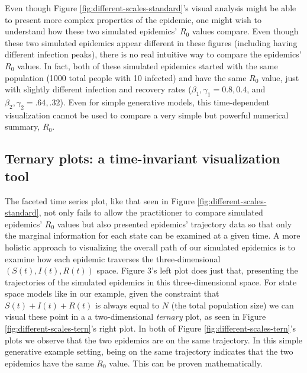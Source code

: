\documentclass[
  shortnames]{jss}
\begin{document}
Even though Figure \ref{fig:different-scales-standard}'s visual analysis
might be able to present more complex properties of the epidemic, one
might wish to understand how these two simulated epidemics' \(R_0\)
values compare. Even though these two simulated epidemics appear
different in these figures (including having different infection peaks),
there is no real intuitive way to compare the epidemics' \(R_0\) values.
In fact, both of these simulated epidemics started with the same
population (1000 total people with 10 infected) and have the same
\(R_0\) value, just with slightly different infection and recovery rates
(\(\beta_1, \gamma_1 = 0.8, 0.4\), and
\(\beta_2, \gamma_2 = .64, .32\)). Even for simple generative models,
this time-dependent visualization cannot be used to compare a very
simple but powerful numerical summary, \(R_0\).

\hypertarget{ternary-plots-a-time-invariant-visualization-tool}{%
\subsection{Ternary plots: a time-invariant visualization
tool}\label{ternary-plots-a-time-invariant-visualization-tool}}

The faceted time series plot, like that seen in Figure
\ref{fig:different-scales-standard}, not only fails to allow the
practitioner to compare simulated epidemics' \(R_0\) values but also
presented epidemics' trajectory data so that only the marginal
information for each state can be examined at a given time. A more
holistic approach to visualizing the overall path of our simulated
epidemics is to examine how each epidemic traverses the
three-dimensional \((S(t),I(t),R(t))\) space. Figure 3's left plot does
just that, presenting the trajectories of the simulated epidemics in
this three-dimensional space. For state space models like in our
example, given the constraint that \(S(t) + I(t)+R(t)\) is always equal
to \(N\) (the total population size) we can visual these point in a a
two-dimensional \textit{ternary} plot, as seen in Figure
\ref{fig:different-scales-tern}'s right plot. In both of Figure
\ref{fig:different-scales-tern}'s plots we observe that the two
epidemics are on the same trajectory. In this simple generative example
setting, being on the same trajectory indicates that the two epidemics
have the same \(R_0\) value. This can be proven mathematically.
\end{document}
